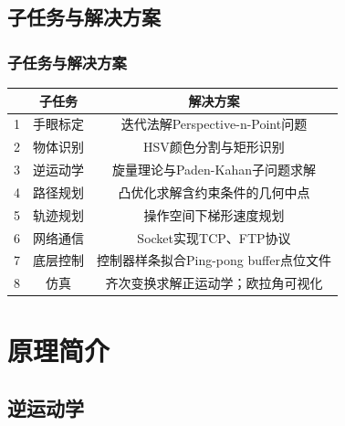 \documentclass{beamer}
\begin{document}

\subsection{子任务与解决方案}


\begin{frame}
    \frametitle{子任务与解决方案}
    \centering
    \begin{tabular}{ccc}
        \toprule
          & 子任务   & 解决方案                               \\
        \midrule
        1 & 手眼标定 & 迭代法解Perspective-n-Point问题        \\
        2 & 物体识别 & HSV颜色分割与矩形识别                  \\
        3 & 逆运动学 & 旋量理论与Paden-Kahan子问题求解        \\
        4 & 路径规划 & 凸优化求解含约束条件的几何中点         \\
        5 & 轨迹规划 & 操作空间下梯形速度规划                 \\
        6 & 网络通信 & Socket实现TCP、FTP协议                 \\
        7 & 底层控制 & 控制器样条拟合Ping-pong buffer点位文件 \\
        8 & 仿真     & 齐次变换求解正运动学；欧拉角可视化     \\
        \bottomrule
    \end{tabular}
\end{frame}


\section{原理简介}
\subsection{逆运动学}
\end{document}
